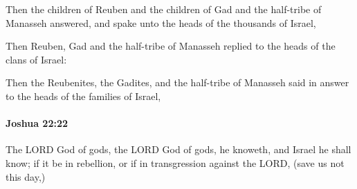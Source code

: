 			\begin{versebox}
					\item[BHS] 
					\item[ASV] Then the children of Reuben and the children of Gad and the half-tribe of Manasseh answered, and spake unto the heads of the thousands of Israel,
					\item[NIV] Then Reuben, Gad and the half-tribe of Manasseh replied to the heads of the clans of Israel:
					\item[NRSV] Then the Reubenites, the Gadites, and the half-tribe of Manasseh said in answer to the heads of the families of Israel,
			\end{versebox}

		\paragraph{Joshua 22:22} %
			\label{JOSHUA-22-22}

			The LORD God of gods, the LORD God of gods, he knoweth, and Israel he shall know; if it be in rebellion, or if in transgression against the LORD, (save us not this day,)

